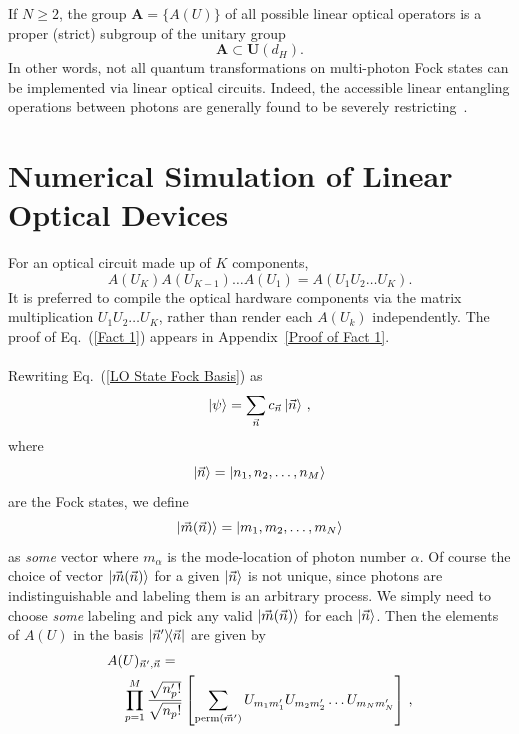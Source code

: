 \documentclass[aps,pra,twocolumn,showpacs,superscriptaddress,floatfix,10pt]{revtex4}
\begin{document}
If $N \ge 2$, the group $\textbf{A}=\{ A(U) \}$  of all possible linear optical operators is a proper (strict) subgroup of the unitary group
\begin{equation}
\label{Proper Subgroup}
\textbf{A} \subset \textbf{U}(d_H).
\end{equation}
In other words, not all quantum transformations on multi-photon Fock states can be implemented via linear optical circuits. Indeed, the accessible linear entangling operations between photons are generally found to be severely restricting~\cite{Matt Smith,Braunstein,Jake Smith,Lougovski,Lutkenhaus,Carollo,Pavicic}. 
\section{Numerical Simulation of Linear Optical Devices}
\label{Section on Protocol}
For an optical circuit made up of $K$ components,
\begin{equation}
	\label{Fact 1}
A(U_K) A(U_{K-1}) \dots A(U_1) = A(U_1 U_2 \dots U_K).
\end{equation}
It is preferred to compile the optical hardware components via the matrix multiplication $U_1 U_2 \dots U_K$, rather than render each $A(U_k)$ independently. The proof of Eq.~(\ref{Fact 1}) appears in Appendix~\ref{Proof of Fact 1}.
\\ \\ \indent
Rewriting Eq.~(\ref{LO State Fock Basis}) as
\begin{equation}
\label{LO State Fock Vec Basis}
\ket{\psi} = \sum_{\vec{n}} c_{\vec{n}} \ket{\vec{n}} \,,
\end{equation}
where
\begin{equation}
\ket{\vec{n}} = \ket{n_1,n_2,\dots,n_M}
\end{equation}
are the Fock states, we define
\begin{equation}
\label{m definition}
\ket{\vec{m}(\vec{n})} = \ket{m_1,m_2,\dots,m_N}
\end{equation}
as \textit{some} vector where $m_\alpha$ is the mode-location of photon number $\alpha$. Of course the choice of vector $\ket{\vec{m}(\vec{n})}$ for a given $\ket{\vec{n}}$ is not unique, since photons are indistinguishable and labeling them is an arbitrary process. We simply need to choose \textit{some} labeling and pick any valid $\ket{\vec{m}(\vec{n})}$ for each $\ket{\vec{n}}$. Then the elements of $A(U)$ in the basis $\outerproduct{\vec{n}^\prime}{\vec{n}}$ are given by
\begin{eqnarray}
\label{Fact 2}
A(U)_{\vec{n}^\prime,\vec{n}} = \quad \quad \quad \quad \quad \quad \quad \quad \quad \quad \quad \quad \quad \quad \quad \quad \quad \\ \small \nonumber \prod_{p=1}^{M} \frac{\sqrt{n_p^\prime !}}{\sqrt{n_p !}} \left[\sum_{\textrm{perm}(\vec{m}^\prime)} U_{m_1 m_1^\prime} U_{m_2 m_2^\prime} \dots U_{m_N m_N^\prime} \right] \,,
\end{eqnarray}
\end{document}
